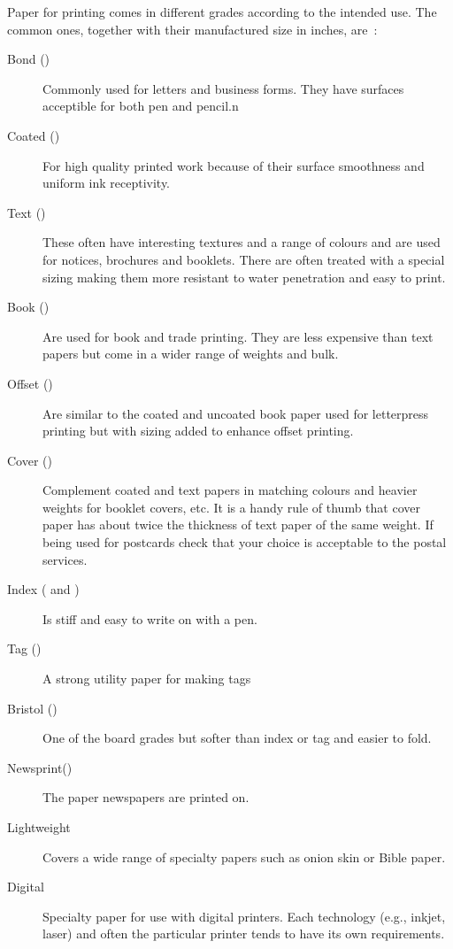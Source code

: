 \documentclass[10pt,a4paper,extrafontsizes]{memoir}
\begin{document}
\begin{paracol}{2}
    Paper for printing comes in different grades according to the intended 
use. The common ones, together with their manufactured size in inches, 
are~\autocite{POCKETPAL}:
\begin{description}
\item[Bond ()] Commonly used for letters and
business forms. They have surfaces acceptible for both pen and pencil.n

\item[Coated ()] For high quality printed
work because of their surface smoothness and uniform ink receptivity.

\item[Text ()] These often have interesting 
textures and a range of colours and are used for notices, brochures and 
booklets. There are often treated with a special sizing making them more
resistant to water penetration and easy to print.

\item[Book ()] Are used for book and trade 
printing. They are less expensive than text papers but come in a wider range
of weights and bulk.

\item[Offset ()] Are similar to the coated and
uncoated book paper used for letterpress printing but with sizing added to
enhance offset printing.

\item[Cover ()] Complement coated and text
papers in matching colours and heavier weights for booklet covers, etc. It is
a handy rule of thumb that cover paper has about twice the thickness of text
paper of the same weight. If being used for postcards check that your choice 
is acceptable to the postal services.

\item[Index ( and )] Is 
stiff and easy to write on with a pen.

\item[Tag  ()] A strong utility paper for making
tags

\item[Bristol ()] One of the board grades
but softer than index or tag and easier to fold.

\item[Newsprint()] The paper newspapers 
are printed on.

\item[Lightweight] Covers a wide range of
specialty papers such as onion skin or Bible paper.

\item[Digital] Specialty paper for use with
digital printers. Each technology (e.g., inkjet, laser) and often 
the particular printer tends to have its own requirements.

\end{description}
\end{paracol}
\end{document}
